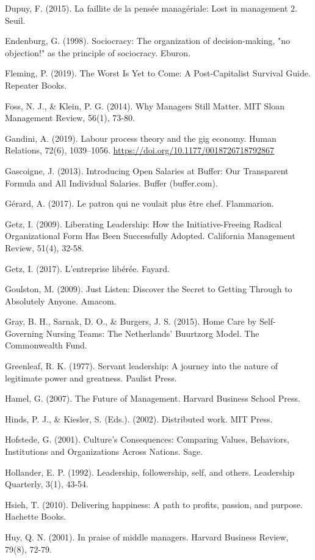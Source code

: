 Dupuy, F. (2015). La faillite de la pensée managériale: Lost in management 2. Seuil.

Endenburg, G. (1998). Sociocracy: The organization of decision-making, "no objection!" as the principle of sociocracy. Eburon.

Fleming, P. (2019). The Worst Is Yet to Come: A Post-Capitalist Survival Guide. Repeater Books.

Foss, N. J., \& Klein, P. G. (2014). Why Managers Still Matter. MIT Sloan Management Review, 56(1), 73-80.

Gandini, A. (2019). Labour process theory and the gig economy. Human Relations, 72(6), 1039–1056. \url{https://doi.org/10.1177/0018726718792867}

Gascoigne, J. (2013). Introducing Open Salaries at Buffer: Our Transparent Formula and All Individual Salaries. Buffer (buffer.com).

Gérard, A. (2017). Le patron qui ne voulait plus être chef. Flammarion.

Getz, I. (2009). Liberating Leadership: How the Initiative-Freeing Radical Organizational Form Has Been Successfully Adopted. California Management Review, 51(4), 32-58.

Getz, I. (2017). L'entreprise libérée. Fayard.

Goulston, M. (2009). Just Listen: Discover the Secret to Getting Through to Absolutely Anyone. Amacom.

Gray, B. H., Sarnak, D. O., \& Burgers, J. S. (2015). Home Care by Self-Governing Nursing Teams: The Netherlands' Buurtzorg Model. The Commonwealth Fund.

Greenleaf, R. K. (1977). Servant leadership: A journey into the nature of legitimate power and greatness. Paulist Press.

Hamel, G. (2007). The Future of Management. Harvard Business School Press.

Hinds, P. J., \& Kiesler, S. (Eds.). (2002). Distributed work. MIT Press.

Hofstede, G. (2001). Culture's Consequences: Comparing Values, Behaviors, Institutions and Organizations Across Nations. Sage.

Hollander, E. P. (1992). Leadership, followership, self, and others. Leadership Quarterly, 3(1), 43-54.

Hsieh, T. (2010). Delivering happiness: A path to profits, passion, and purpose. Hachette Books.

Huy, Q. N. (2001). In praise of middle managers. Harvard Business Review, 79(8), 72-79.

